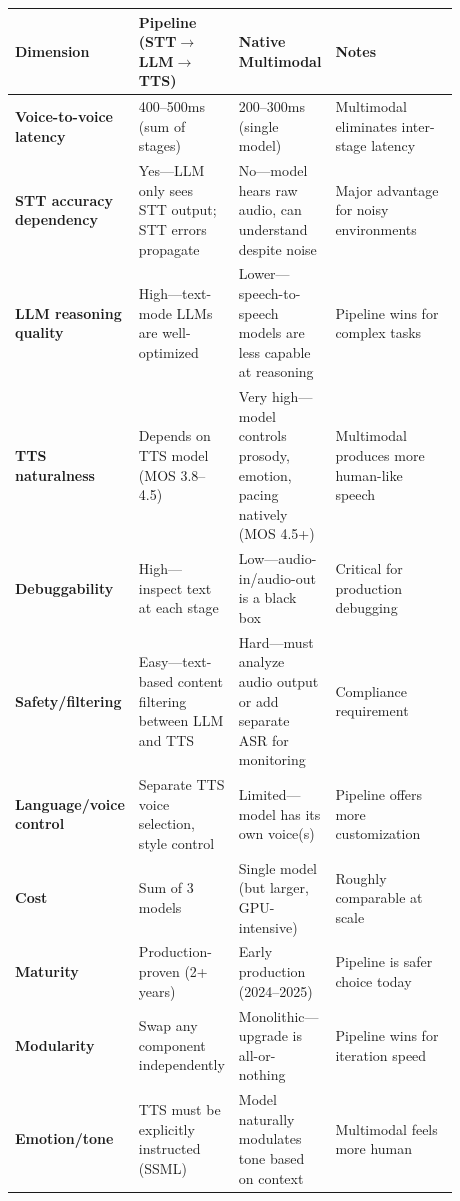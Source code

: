 {\small
\begin{tabular}{|p{0.14\linewidth}|p{0.18\linewidth}|p{0.18\linewidth}|p{0.38\linewidth}|}
\hline
\textbf{Dimension} & \textbf{Pipeline (STT$\rightarrow$LLM$\rightarrow$TTS)} & \textbf{Native Multimodal} & \textbf{Notes} \\
\hline
\textbf{Voice-to-voice latency} & 400--500ms (sum of stages) & 200--300ms (single model) & Multimodal eliminates inter-stage latency \\
\hline
\textbf{STT accuracy dependency} & Yes---LLM only sees STT output; STT errors propagate & No---model hears raw audio, can understand despite noise & Major advantage for noisy environments \\
\hline
\textbf{LLM reasoning quality} & High---text-mode LLMs are well-optimized & Lower---speech-to-speech models are less capable at reasoning & Pipeline wins for complex tasks \\
\hline
\textbf{TTS naturalness} & Depends on TTS model (MOS 3.8--4.5) & Very high---model controls prosody, emotion, pacing natively (MOS 4.5+) & Multimodal produces more human-like speech \\
\hline
\textbf{Debuggability} & High---inspect text at each stage & Low---audio-in/audio-out is a black box & Critical for production debugging \\
\hline
\textbf{Safety/filtering} & Easy---text-based content filtering between LLM and TTS & Hard---must analyze audio output or add separate ASR for monitoring & Compliance requirement \\
\hline
\textbf{Language/voice control} & Separate TTS voice selection, style control & Limited---model has its own voice(s) & Pipeline offers more customization \\
\hline
\textbf{Cost} & Sum of 3 models & Single model (but larger, GPU-intensive) & Roughly comparable at scale \\
\hline
\textbf{Maturity} & Production-proven (2+ years) & Early production (2024--2025) & Pipeline is safer choice today \\
\hline
\textbf{Modularity} & Swap any component independently & Monolithic---upgrade is all-or-nothing & Pipeline wins for iteration speed \\
\hline
\textbf{Emotion/tone} & TTS must be explicitly instructed (SSML) & Model naturally modulates tone based on context & Multimodal feels more human \\
\hline
\end{tabular}
}


